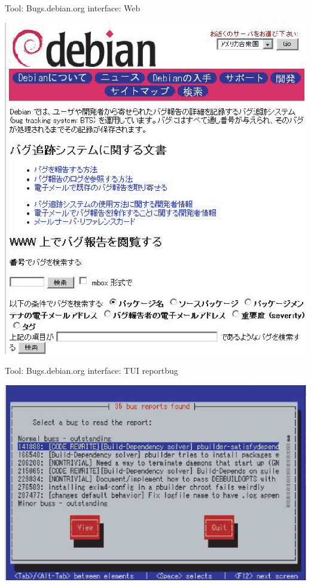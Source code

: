 \documentclass[cjk,dvipdfm,12pt]{beamer}
\begin{document}
\begin{frame}{Tool: Bugs.debian.org interface: Web}

\includegraphics{image200508/bts.eps}
\end{frame}

\begin{frame}{Tool: Bugs.debian.org interface: TUI}
reportbug

 \includegraphics[width=1\hsize]{image200508/reportbug.eps}
\end{frame}
\end{document}
